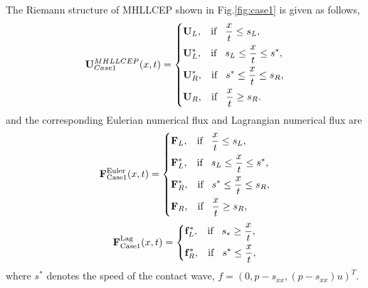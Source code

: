 \documentclass[review]{elsarticle}
\begin{document}
The Riemann structure of MHLLCEP  shown in Fig.\ref{fig:case1} is given as follows,
\begin{equation}\label{eq:HLLCEP}
  \mathbf{U}^{{MHLLCEP}}_{{Case1}}(x,t) = \left\{ \begin{aligned}
        & \mathbf{U}_L, \hspace{0.3cm} \text{if} \hspace{0.3cm} \frac{x}{t}\le s_L, \\
        & \mathbf{U}_L^*, \hspace{0.3cm} \text{if} \hspace{0.3cm} s_L\le \frac{x}{t} \le s^*, \\
        & \mathbf{U}_R^*, \hspace{0.3cm} \text{if} \hspace{0.3cm} s^*\le \frac{x}{t} \le s_R,\\
        & \mathbf{U}_R, \hspace{0.3cm} \text{if} \hspace{0.3cm} \frac{x}{t}\ge s_R. \\
      \end{aligned}
    \right.
  \end{equation}
  and the corresponding Eulerian numerical flux and Lagrangian numerical flux are
 \begin{equation}
    \mathbf{F}^{\text{Euler}}_{\text{Case1}}(x,t) = \left\{ \begin{aligned}
        & \mathbf{F}_L, \hspace{0.3cm} \text{if} \hspace{0.3cm} \frac{x}{t}\le s_L, \\
        & \mathbf{F}_L^*, \hspace{0.3cm} \text{if} \hspace{0.3cm} s_L\le \frac{x}{t} \le s^*, \\
        & \mathbf{F}_R^*, \hspace{0.3cm} \text{if} \hspace{0.3cm} s^*\le \frac{x}{t} \le s_R,\\
        & \mathbf{F}_R, \hspace{0.3cm} \text{if} \hspace{0.3cm} \frac{x}{t}\ge s_R, \\
      \end{aligned}
    \right.
  \end{equation}
\begin{equation}
    \mathbf{F}^{\text{Lag}}_{\text{Case1}}(x,t) = \left\{ \begin{aligned}
        & \mathbf{f}_L^*, \hspace{0.3cm} \text{if} \hspace{0.3cm} s_*\ge \frac{x}{t},\\
        & \mathbf{f}_R^*, \hspace{0.3cm} \text{if} \hspace{0.3cm} s^*\le \frac{x}{t},\\
      \end{aligned}
    \right.
  \end{equation}
where $s^*$ denotes the speed of the contact wave, $f=(0,p-s_{xx},(p-s_{xx})u)^{T}$.
\end{document}
